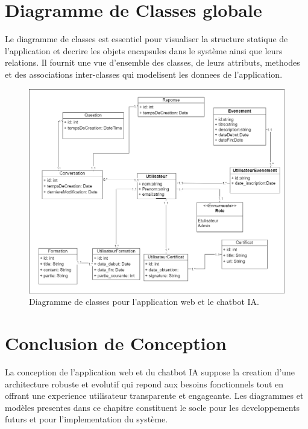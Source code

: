 \documentclass[a4paper, 11pt, openany]{report}
\begin{document}
\section{Diagramme de Classes globale}

Le diagramme de classes est essentiel pour visualiser la structure statique de l'application et decrire les objets encapsules dans le système ainsi que leurs relations. Il fournit une vue d'ensemble des classes, de leurs attributs, methodes et des associations inter-classes qui modelisent les donnees de l'application.

\clearpage
\begin{figure}[h!]
\centering
\includegraphics[width=\textwidth]{images/class.png}
\caption{Diagramme de classes pour l'application web et le chatbot IA.}
\label{fig:class_diagram}
\end{figure}

\section{Conclusion de Conception}
La conception de l'application web et du chatbot IA suppose la creation d'une architecture robuste et evolutif qui repond aux besoins fonctionnels tout en offrant une experience utilisateur transparente et engageante. Les diagrammes et modèles presentes dans ce chapitre constituent le socle pour les developpements futurs et pour l'implementation du système.

\end{document}
